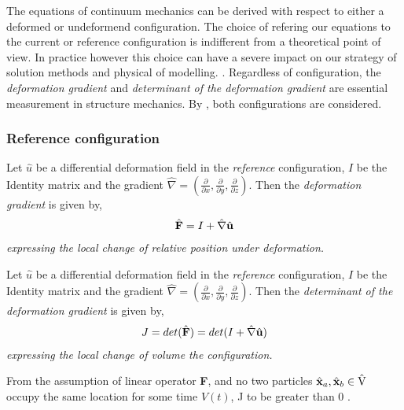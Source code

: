 \begin{appendices}
The equations of continuum mechanics can be derived with respect to either a deformed or undeformend configuration. The choice of refering our equations to the current or reference configuration is indifferent from a theoretical point of view. In practice however this choice can have a severe impact on our strategy of solution methods and physical of modelling.   \cite{Wriggers2006}. Regardless of configuration, the \textit{deformation gradient} and \textit{determinant of the deformation gradient} are essential measurement in structure mechanics. 
By \cite{Richter2016}, both configurations are considered.

\subsubsection*{Reference configuration}
\begin{defn}
Let $\hat{u}$ be a differential deformation field in the \textit{reference} configuration, $I$ be the Identity matrix and
the gradient $\hat{\nabla} = (\frac{\partial}{\partial x}, \frac{\partial}{\partial y}, \frac{\partial}{\partial z}) $. Then the \textit{deformation gradient} is given by,
\begin{align}
\hat{\mathbf{F}} = I + \hat{\nabla} \hat{\mathbf{u}} 
\end{align} 
\textit{expressing the local change of relative position under deformation.}
\end{defn}

\begin{defn}
Let $\hat{u}$ be a differential deformation field in the \textit{reference} configuration, $I$ be the Identity matrix and
the gradient $\hat{\nabla} = (\frac{\partial}{\partial x}, \frac{\partial}{\partial y}, \frac{\partial}{\partial z}) $. Then the \textit{determinant of the deformation gradient} is given by,
\begin{align}
J = det(\hat{\mathbf{F}}) = det( I + \hat{\nabla} \hat{\mathbf{u}} )
\end{align} 
\textit{expressing the local change of volume the configuration.}
\end{defn}

From the assumption of linear operator \textbf{F}, and no two particles $\hat{\mathbf{x}}_a, \hat{\mathbf{x}}_b \in \text{\^{V}}$ occupy the same location for some time $V(t)$,  J to be greater than 0 \cite{Wriggers2006}. \\ \\


\end{appendices}
